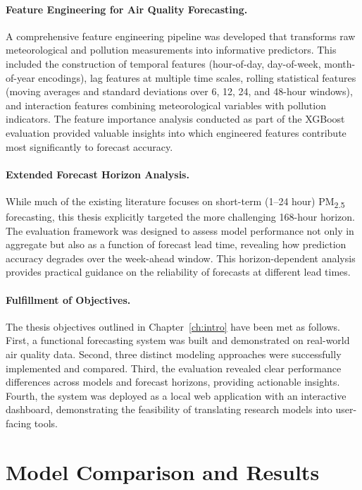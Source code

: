 \paragraph{Feature Engineering for Air Quality Forecasting.}
A comprehensive feature engineering pipeline was developed that transforms raw meteorological and pollution measurements into informative predictors. This included the construction of temporal features (hour-of-day, day-of-week, month-of-year encodings), lag features at multiple time scales, rolling statistical features (moving averages and standard deviations over 6, 12, 24, and 48-hour windows), and interaction features combining meteorological variables with pollution indicators. The feature importance analysis conducted as part of the XGBoost evaluation provided valuable insights into which engineered features contribute most significantly to forecast accuracy.

\paragraph{Extended Forecast Horizon Analysis.}
While much of the existing literature focuses on short-term (1--24 hour) PM\textsubscript{2.5} forecasting, this thesis explicitly targeted the more challenging 168-hour horizon. The evaluation framework was designed to assess model performance not only in aggregate but also as a function of forecast lead time, revealing how prediction accuracy degrades over the week-ahead window. This horizon-dependent analysis provides practical guidance on the reliability of forecasts at different lead times.

\paragraph{Fulfillment of Objectives.}
The thesis objectives outlined in Chapter~\ref{ch:intro} have been met as follows. First, a functional forecasting system was built and demonstrated on real-world air quality data. Second, three distinct modeling approaches were successfully implemented and compared. Third, the evaluation revealed clear performance differences across models and forecast horizons, providing actionable insights. Fourth, the system was deployed as a local web application with an interactive dashboard, demonstrating the feasibility of translating research models into user-facing tools.

\section{Model Comparison and Results}
\label{sec:sum-results}

